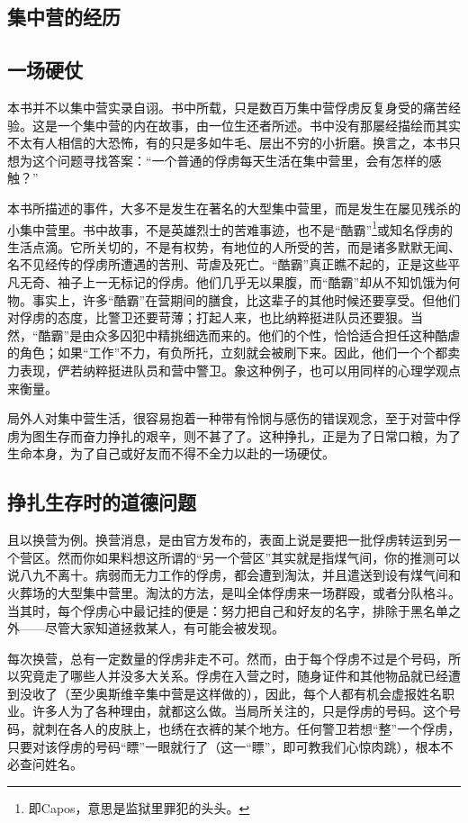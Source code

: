 \documentclass[11pt,oneside]{book}
\begin{document}
\begin{common-format}
\chapter{集中营的经历}
\section{一场硬仗}
本书并不以集中营实录自诩。书中所载，只是数百万集中营俘虏反复身受的痛苦经验。这是一个集中营的内在故事，由一位生还者所述。书中没有那屡经描绘而其实不太有人相信的大恐怖，有的只是多如牛毛、层出不穷的小折磨。换言之，本书只想为这个问题寻找答案：“一个普通的俘虏每天生活在集中营里，会有怎样的感触？”

本书所描述的事件，大多不是发生在著名的大型集中营里，而是发生在屡见残杀的小集中营里。书中故事，不是英雄烈士的苦难事迹，也不是“酷霸”\footnote{即Capos，意思是监狱里罪犯的头头。}或知名俘虏的生活点滴。它所关切的，不是有权势，有地位的人所受的苦，而是诸多默默无闻、名不见经传的俘虏所遭遇的苦刑、苛虐及死亡。“酷霸”真正瞧不起的，正是这些平凡无奇、袖子上一无标记的俘虏。他们几乎无以果腹，而“酷霸”却从不知饥饿为何物。事实上，许多“酷霸”在营期间的膳食，比这辈子的其他时候还要享受。但他们对俘虏的态度，比警卫还要苛薄；打起人来，也比纳粹挺进队员还要狠。当然，“酷霸”是由众多囚犯中精挑细选而来的。他们的个性，恰恰适合担任这种酷虐的角色；如果“工作”不力，有负所托，立刻就会被刷下来。因此，他们一个个都卖力表现，俨若纳粹挺进队员和营中警卫。象这种例子，也可以用同样的心理学观点来衡量。

局外人对集中营生活，很容易抱着一种带有怜悯与感伤的错误观念，至于对营中俘虏为图生存而奋力挣扎的艰辛，则不甚了了。这种挣扎，正是为了日常口粮，为了生命本身，为了自己或好友而不得不全力以赴的一场硬仗。

\section{挣扎生存时的道德问题}
且以换营为例。换营消息，是由官方发布的，表面上说是要把一批俘虏转运到另一个营区。然而你如果料想这所谓的“另一个营区”其实就是指煤气间，你的推测可以说八九不离十。病弱而无力工作的俘虏，都会遭到淘汰，并且遣送到设有煤气间和火葬场的大型集中营里。淘汰的方法，是叫全体俘虏来一场群殴，或者分队格斗。当其时，每个俘虏心中最记挂的便是：努力把自己和好友的名字，排除于黑名单之外——尽管大家知道拯救某人，有可能会被发现。

每次换营，总有一定数量的俘虏非走不可。然而，由于每个俘虏不过是个号码，所以究竟走了哪些人并没多大关系。俘虏在入营之时，随身证件和其他物品就已经遭到没收了（至少奥斯维辛集中营是这样做的），因此，每个人都有机会虚报姓名职业。许多人为了各种理由，就都这么做。当局所关注的，只是俘虏的号码。这个号码，就刺在各人的皮肤上，也绣在衣裤的某个地方。任何警卫若想“整”一个俘虏，只要对该俘虏的号码“瞟”一眼就行了（这一“瞟”，即可教我们心惊肉跳），根本不必查问姓名。


\end{common-format}
\end{document}
